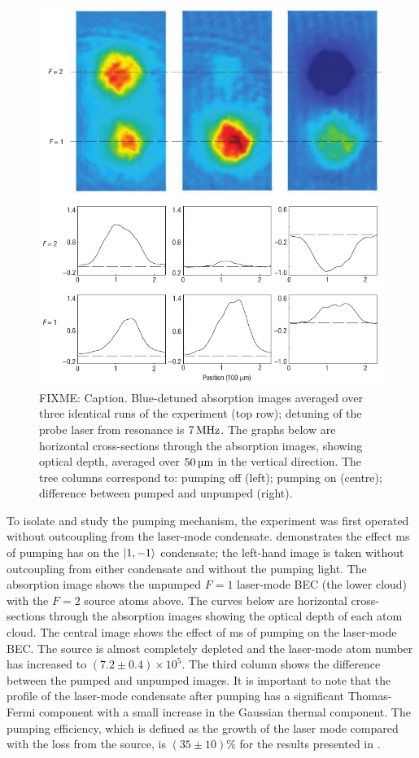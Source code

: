 \begin{figure}
    \centering
    \includegraphics[width=12cm]{ExperimentalResults}
    \caption{FIXME: Caption.  Blue-detuned absorption images averaged over three identical runs of the experiment (top row); detuning of the probe laser from resonance is $\unit[7]{MHz}$.  The graphs below are horizontal cross-sections through the absorption images, showing optical depth, averaged over $\unit[50]{\micro m}$ in the vertical direction.  The tree columns correspond to: pumping off (left); pumping on (centre); difference between pumped and unpumped (right).}
    \label{OpticalPumping:ExperimentalResults}
\end{figure}

To isolate and study the pumping mechanism, the experiment was first operated without outcoupling from the laser-mode condensate.   demonstrates the effect \unit[200]{ms} of pumping has on the ${\left|1, -1\right>}$ condensate; the left-hand image is taken without outcoupling from either condensate and without the pumping light.  The absorption image shows the unpumped $F=1$ laser-mode BEC (the lower cloud) with the $F=2$ source atoms above.  The curves below are horizontal cross-sections through the absorption images showing the optical depth of each atom cloud.  The central image shows the effect of \unit[200]{ms} of pumping on the laser-mode BEC.   The source is almost completely depleted and the laser-mode atom number has increased to $(7.2 \pm 0.4)\times 10^5$.  The third column shows the difference between the pumped and unpumped images. It is important to note that the profile of the laser-mode condensate after pumping has a significant Thomas-Fermi component with a small increase in the Gaussian thermal component.  The pumping efficiency, which is defined as the growth of the laser mode compared with the loss from the source, is $(35 \pm 10)\%$ for the results presented in .

